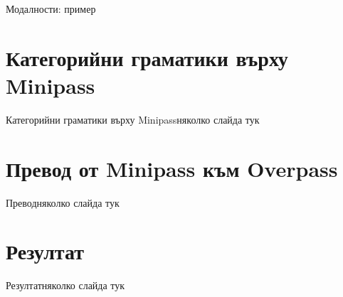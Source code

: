 \documentclass[9pt]{beamer}
\begin{document}
  \begin{frame}{Модалности: пример}

    \begin{center}
      \begin{minipage}{0.5\textwidth}
      \end{minipage}%
    \end{center}
  \end{frame}

  \section{Категорийни граматики върху Minipass}
  \begin{frame}{Категорийни граматики върху Minipass}няколко слайда тук\end{frame}

  \section{Превод от Minipass към Overpass}
  \begin{frame}{Превод}няколко слайда тук\end{frame}

  \section{Резултат}
  \begin{frame}{Резултат}няколко слайда тук\end{frame}
\end{document}
